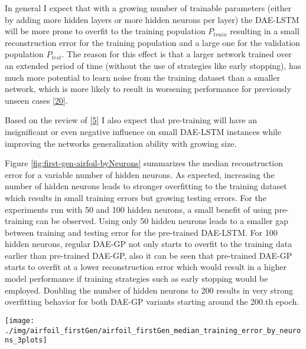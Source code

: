 \documentclass[
  11pt,
]{article}
\let\origfigure\figure
\let\endorigfigure\endfigure
\renewenvironment{figure}[1][2] {
    \expandafter\origfigure\expandafter[H]
} {
    \endorigfigure
}
\begin{document}
In general I expect that with a growing number of trainable parameters (either by adding more hidden layers or more hidden neurons per layer) the DAE-LSTM will be more prone to overfit to the training population \(P_{train}\) resulting in a small reconstruction error for the training population and a large one for the validation population \(P_{test}\). The reason for this effect is that a larger network trained over an extended period of time (without the use of strategies like early stopping), has much more potential to learn noise from the training dataset than a smaller network, which is more likely to result in worsening performance for previously unseen cases {[}\protect\hyperlink{ref-weigend1994overfitting}{20}{]}.

Based on the review of {[}\protect\hyperlink{ref-pmlr-v5-erhan09a}{5}{]} I also expect that pre-training will have an insignificant or even negative influence on small DAE-LSTM instances while improving the networks generalization ability with growing size.

Figure \ref{fig:first-gen-airfoil-byNeurons} summarizes the median reconstruction error for a variable number of hidden neurons. As expected, increasing the number of hidden neurons leads to stronger overfitting to the training dataset which results in small training errors but growing testing errors. For the experiments run with 50 and 100 hidden neurons, a small benefit of using pre-training can be observed. Using only 50 hidden neurons leads to a smaller gap between training and testing error for the pre-trained DAE-LSTM. For 100 hidden neurons, regular DAE-GP not only starts to overfit to the training data earlier than pre-trained DAE-GP, also it can be seen that pre-trained DAE-GP starts to overfit at a lower reconstruction error which would result in a higher model performance if training strategies such as early stopping would be employed. Doubling the number of hidden neurons to 200 results in very strong overfitting behavior for both DAE-GP variants starting around the 200.th epoch.

\begin{figure}[c]

{\centering \texttt{[image: ./img/airfoil\_firstGen/airfoil\_firstGen\_median\_training\_error\_by\_neurons\_3plots]} 

}

\caption{First Generation Median Reconstruction Error for variable number of hidden Neurons}\label{fig:first-gen-airfoil-byNeurons}
\end{figure}
\end{document}
